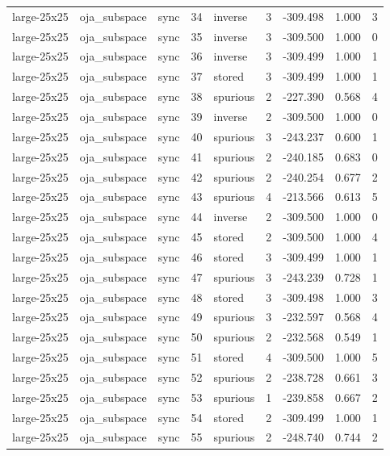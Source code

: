 \begin{tabular}{lllrlrrrr}
large-25x25 & oja\_subspace & sync & 34 & inverse & 3 & -309.498 & 1.000 & 3 \\
large-25x25 & oja\_subspace & sync & 35 & inverse & 3 & -309.500 & 1.000 & 0 \\
large-25x25 & oja\_subspace & sync & 36 & inverse & 3 & -309.499 & 1.000 & 1 \\
large-25x25 & oja\_subspace & sync & 37 & stored & 3 & -309.499 & 1.000 & 1 \\
large-25x25 & oja\_subspace & sync & 38 & spurious & 2 & -227.390 & 0.568 & 4 \\
large-25x25 & oja\_subspace & sync & 39 & inverse & 2 & -309.500 & 1.000 & 0 \\
large-25x25 & oja\_subspace & sync & 40 & spurious & 3 & -243.237 & 0.600 & 1 \\
large-25x25 & oja\_subspace & sync & 41 & spurious & 2 & -240.185 & 0.683 & 0 \\
large-25x25 & oja\_subspace & sync & 42 & spurious & 2 & -240.254 & 0.677 & 2 \\
large-25x25 & oja\_subspace & sync & 43 & spurious & 4 & -213.566 & 0.613 & 5 \\
large-25x25 & oja\_subspace & sync & 44 & inverse & 2 & -309.500 & 1.000 & 0 \\
large-25x25 & oja\_subspace & sync & 45 & stored & 2 & -309.500 & 1.000 & 4 \\
large-25x25 & oja\_subspace & sync & 46 & stored & 3 & -309.499 & 1.000 & 1 \\
large-25x25 & oja\_subspace & sync & 47 & spurious & 3 & -243.239 & 0.728 & 1 \\
large-25x25 & oja\_subspace & sync & 48 & stored & 3 & -309.498 & 1.000 & 3 \\
large-25x25 & oja\_subspace & sync & 49 & spurious & 3 & -232.597 & 0.568 & 4 \\
large-25x25 & oja\_subspace & sync & 50 & spurious & 2 & -232.568 & 0.549 & 1 \\
large-25x25 & oja\_subspace & sync & 51 & stored & 4 & -309.500 & 1.000 & 5 \\
large-25x25 & oja\_subspace & sync & 52 & spurious & 2 & -238.728 & 0.661 & 3 \\
large-25x25 & oja\_subspace & sync & 53 & spurious & 1 & -239.858 & 0.667 & 2 \\
large-25x25 & oja\_subspace & sync & 54 & stored & 2 & -309.499 & 1.000 & 1 \\
large-25x25 & oja\_subspace & sync & 55 & spurious & 2 & -248.740 & 0.744 & 2 \\

\end{tabular}
